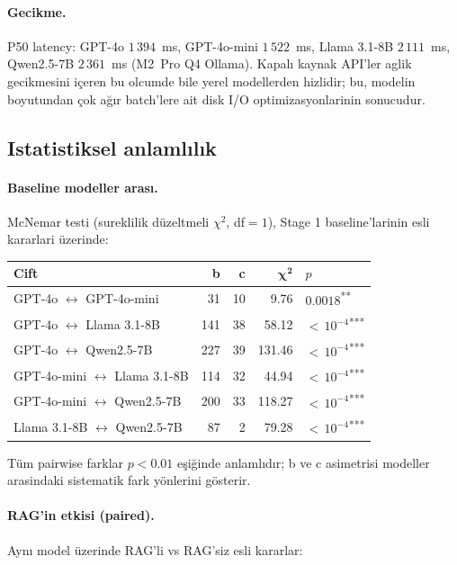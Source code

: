 \documentclass[11pt,a4paper]{article}
\begin{document}
\paragraph{Gecikme.} P50 latency: GPT-4o $1\,394$~ms, GPT-4o-mini
$1\,522$~ms, Llama 3.1-8B $2\,111$~ms, Qwen2.5-7B $2\,361$~ms (M2~Pro Q4
Ollama). Kapalı kaynak API'ler aglik gecikmesini içeren bu olcumde bile
yerel modellerden hizlidir; bu, modelin boyutundan çok ağır batch'lere ait
disk I/O optimizasyonlarinin sonucudur.

\subsection{Istatistiksel anlamlılık}
\paragraph{Baseline modeller arası.} McNemar testi (sureklilik düzeltmeli
$\chi^2$, df$=1$), Stage 1 baseline'larinin esli kararlari üzerinde:

\begin{tabularx}{\columnwidth}{X r r r l}
\toprule
\textbf{Cift} & \textbf{b} & \textbf{c} & $\boldsymbol{\chi^2}$ & \textbf{$p$} \\
\midrule
GPT-4o $\leftrightarrow$ GPT-4o-mini       & 31  & 10 & 9.76   & $0.0018$\;\textsuperscript{**} \\
GPT-4o $\leftrightarrow$ Llama 3.1-8B      & 141 & 38 & 58.12  & ${<}\,10^{-4}$\;\textsuperscript{***} \\
GPT-4o $\leftrightarrow$ Qwen2.5-7B        & 227 & 39 & 131.46 & ${<}\,10^{-4}$\;\textsuperscript{***} \\
GPT-4o-mini $\leftrightarrow$ Llama 3.1-8B & 114 & 32 & 44.94  & ${<}\,10^{-4}$\;\textsuperscript{***} \\
GPT-4o-mini $\leftrightarrow$ Qwen2.5-7B   & 200 & 33 & 118.27 & ${<}\,10^{-4}$\;\textsuperscript{***} \\
Llama 3.1-8B $\leftrightarrow$ Qwen2.5-7B  & 87  & 2  & 79.28  & ${<}\,10^{-4}$\;\textsuperscript{***} \\
\bottomrule
\end{tabularx}

\noindent Tüm pairwise farklar $p < 0.01$ eşiğinde anlamlıdır; b ve c
asimetrisi modeller arasindaki sistematik fark yönlerini gösterir.

\paragraph{RAG'in etkisi (paired).} Aynı model üzerinde RAG'li vs RAG'siz
esli kararlar:
\end{document}
